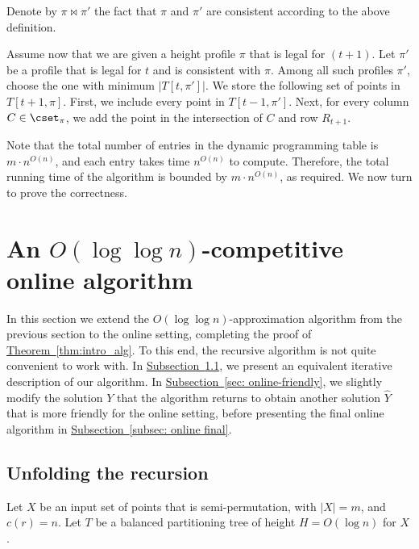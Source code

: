 \documentclass[11pt]{article}
\numberwithin{equation}{section}
\theoremstyle{definition}
\theoremstyle{plain}
\newcommand{\expref}[2]{\hyperref[#2]{#1~\ref{#2}}}
\begin{document}
Denote by $\pi \bowtie \pi'$ the fact that $\pi$ and $\pi'$ are consistent according to the above definition. 


Assume now that we are given a height profile $\pi$ that is legal for $(t+1)$. 
Let $\pi'$ be a profile that is legal for $t$ and is consistent with $\pi$. Among all such profiles $\pi'$, choose the one with minimum $|T[t,\pi']|$. We store the following set of points in $T[t+1,\pi]$. First, we include every point in $T[t-1,\pi']$. Next, for every column $C\in \cset_{\pi}$, we add the point in the intersection of $C$ and row $R_{t+1}$.

Note that the total number of entries in the dynamic programming table is $m\cdot n^{O(n)}$, and each entry takes time $n^{O(n)}$ to compute. Therefore, the total running time of the algorithm is bounded by $m\cdot n^{O(n)}$, as required. We now turn to prove the correctness.
\fi


%

\newcommand{\first}{{\sf first}} 

\newcommand{\last}{{\sf last}} 


\newcommand{\proj}{{\sf proj}} 

\section{An $O(\log \log n)$-competitive online algorithm}  
\label{sec: online}

In this section we extend the $O(\log\log n)$-approximation algorithm from the previous section to the online setting, completing the proof of \expref{Theorem}{thm:intro_alg}. To this end, the recursive algorithm is not quite convenient to work with. In \expref{Subsection}{subsec: unfold}, we present an equivalent iterative description of our algorithm. In \expref{Subsection}{sec: online-friendly}, we slightly modify the solution $Y$ that the algorithm returns to obtain another solution $\hat{Y}$ that is more friendly for the online setting, before presenting the final online algorithm in \expref{Subsection}{subsec: online final}.


\subsection{Unfolding the recursion} 
\label{subsec: unfold}  
 
Let $X$ be an input set of points that is semi-permutation, with $|X|=m$, and $c(r)=n$. Let $T$ be a balanced partitioning tree of height $H=O(\log n)$ for $X$. %
\end{document}
